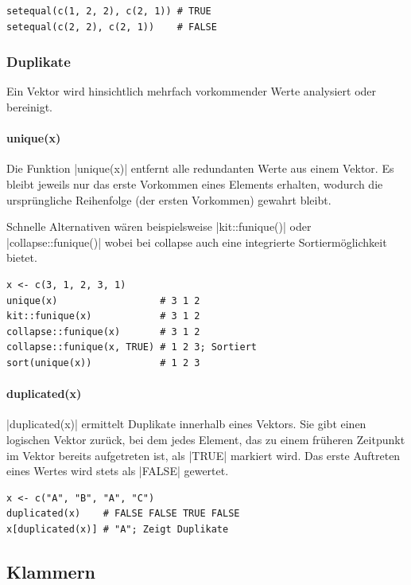 \documentclass[10pt,twocolumn]{scrartcl}
\renewcommand{\lstinline}{\mycoloredinline}
\begin{document}
\begin{lstlisting}
setequal(c(1, 2, 2), c(2, 1)) # TRUE
setequal(c(2, 2), c(2, 1))    # FALSE
\end{lstlisting}


\subsubsection{Duplikate}

Ein Vektor wird hinsichtlich mehrfach vorkommender Werte analysiert oder bereinigt.

\paragraph{unique(x)}

Die Funktion \lstinline|unique(x)| entfernt alle redundanten Werte aus einem Vektor. Es bleibt jeweils nur das erste Vorkommen eines Elements erhalten, wodurch die ursprüngliche Reihenfolge (der ersten Vorkommen) gewahrt bleibt.

Schnelle Alternativen wären beispielsweise \lstinline|kit::funique()| oder \lstinline|collapse::funique()| wobei bei collapse auch eine integrierte Sortiermöglichkeit bietet.


\begin{lstlisting}
x <- c(3, 1, 2, 3, 1)
unique(x)                  # 3 1 2
kit::funique(x)            # 3 1 2
collapse::funique(x)       # 3 1 2
collapse::funique(x, TRUE) # 1 2 3; Sortiert
sort(unique(x))            # 1 2 3
\end{lstlisting}

\paragraph{duplicated(x)}

\lstinline|duplicated(x)| ermittelt Duplikate innerhalb eines Vektors. Sie gibt einen logischen Vektor zurück, bei dem jedes Element, das zu einem früheren Zeitpunkt im Vektor bereits aufgetreten ist, als \lstinline|TRUE| markiert wird. Das erste Auftreten eines Wertes wird stets als \lstinline|FALSE| gewertet.

\begin{lstlisting}
x <- c("A", "B", "A", "C")
duplicated(x)    # FALSE FALSE TRUE FALSE
x[duplicated(x)] # "A"; Zeigt Duplikate
\end{lstlisting}


\subsection{Klammern}
\end{document}
